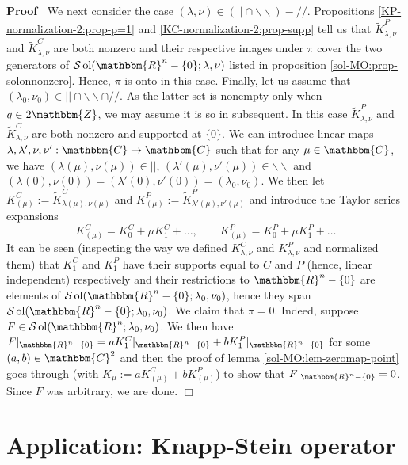 \documentclass{article}
\newcommand{\assign}{:=}
\newcommand{\tmop}[1]{\ensuremath{\operatorname{#1}}}
\newenvironment{proof}{\noindent\textbf{Proof\ }}{\hspace*{\fill}$\Box$\medskip}
\numberwithin{definition}{section}
\numberwithin{lemma}{section}
\numberwithin{proposition}{section}
{\theorembodyfont{\rmfamily}\newtheorem{remark}{Remark}
\numberwithin{remark}{section}
}
\begin{document}
\begin{proof}
  We next consider the case $( \lambda, \nu) \in ( | | \cap
  \backslash\backslash) - / /$. Propositions \ref{KP-normalization-2:prop-p=1}
  and \ref{KC-normalization-2:prop-supp} tell us that $\tilde{K}_{\lambda,
  \nu}^P$ and $\tilde{K}_{\lambda, \nu}^C$ are both nonzero and their
  respective images under $\pi$ cover the two generators of $\mathcal{S}
  \tmop{ol} ( \mathbbm{R}^n - \{ 0 \} ; \lambda, \nu)$ listed in proposition
  \ref{sol-MO:prop-solonnonzero}. Hence, $\pi$ is onto in this case. Finally,
  let us assume that $( \lambda_0, \nu_0) \in | | \cap \backslash\backslash
  \cap / /$. As the latter set is nonempty only when $q \in 2\mathbbm{Z}$, we
  may assume it is so in subsequent. In this case $\tilde{K}_{\lambda, \nu}^P$
  and $\tilde{K}_{\lambda, \nu}^C$ are both nonzero and supported at $\{ 0
  \}$. We can introduce linear maps $\lambda, \lambda', \nu, \nu' :
  \mathbbm{C} \rightarrow \mathbbm{C}$ such that for any $\mu \in
  \mathbbm{C}$, we have $( \lambda ( \mu), \nu ( \mu)) \in | |$, $( \lambda' (
  \mu), \nu' ( \mu)) \in \backslash\backslash$ and $( \lambda_{} ( 0), \nu (
  0)) = ( \lambda' ( 0), \nu' ( 0)) = ( \lambda_0, \nu_0)$. We then let
  $K^C_{( \mu)} \assign \tilde{K}_{\lambda ( \mu), \nu ( \mu)}^C$ and $K^P_{(
  \mu)} \assign \tilde{K}^P_{\lambda' ( \mu), \nu' ( \mu)}$ and introduce the
  Taylor series expansions
  \[ K^C_{( \mu)} = K^C_0 + \mu K_1^C + \ldots, \hspace{2em} K^P_{( \mu)} =
     K_0^P + \mu K_1^P + \ldots \]
  It can be seen (inspecting the way we defined $K_{\lambda, \nu}^C$ and
  $K_{\lambda, \nu}^P$ and normalized them) that $K_1^C$ and $K_1^P$ have
  their supports equal to $C$ and $P$ (hence, linear independent) respectively
  and their restrictions to $\mathbbm{R}^n - \{ 0 \}$ are elements of
  $\mathcal{S} \tmop{ol} ( \mathbbm{R}^n - \{ 0 \} ; \lambda_0, \nu_0)$, hence
  they span $\mathcal{S} \tmop{ol} ( \mathbbm{R}^n - \{ 0 \} ; \lambda_0,
  \nu_0)$. We claim that $\pi = 0$. Indeed, suppose $F \in \mathcal{S}
  \tmop{ol} ( \mathbbm{R}^n ; \lambda_0, \nu_0)$. We then have $F
  |_{\mathbbm{R}^n - \{ 0 \}} = a K_1^C |_{\mathbbm{R}^n - \{ 0 \}} + b K_1^P
  |_{\mathbbm{R}^n - \{ 0 \}}$ for some $( a, b) \in \mathbbm{C}^2$ and then
  the proof of lemma \ref{sol-MO:lem-zeromap-point} goes through (with
  $K_{\mu} \assign a K_{( \mu)}^C + b K^P_{( \mu)}$) to show that $F
  |_{\mathbbm{R}^n - \{ 0 \}} = 0$. Since $F$ was arbitrary, we are done.
\end{proof}

\section{Application: Knapp-Stein operator}\label{sec:knappstein}
\end{document}
